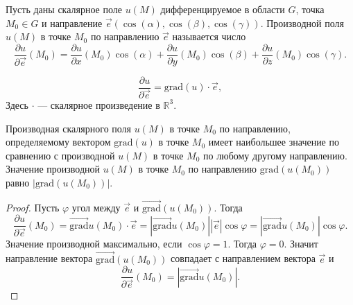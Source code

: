\begin{definition}
    Пусть даны скалярное поле $ u(M) $ дифференцируемое в области $ G $, точка $ M_{0} \in G $ и направление $ \vec{e}\left(
        \cos(\alpha), \cos(\beta), \cos(\gamma)\right) $. Производной поля $ u(M) $ в точке $ M_{0} $ по направлению $ \vec{e} $
    называется число
    \begin{equation} \nonumber
        \frac{\partial u}{\partial \vec{e}}(M_{0}) = \frac{\partial u}{\partial x}(M_{0})\cos(\alpha) + \frac{\partial u} {\partial y}(M_{0})\cos(\beta) + \frac{\partial u}{\partial z}(M_{0})\cos(\gamma).
    \end{equation}
\end{definition}

\begin{remark}
    \begin{equation} \nonumber
        \frac{\partial u}{\partial \vec{e}} = \text{grad}(u) \cdot \vec{e},
    \end{equation}
    Здесь $ \cdot $ --- скалярное произведение в $ \mathbb{R}^{3} $.
\end{remark}

\begin{theorem}
    Производная скалярного поля $ u(M) $ в точке $ M_{0} $ по направлению, определяемому вектором $ \text{grad}(u) $ в точке $ M_{0} $
    имеет наибольшее значение по сравнению с производной $ u(M) $ в точке $ M_{0} $ по любому другому направлению. Значение производной
    $ u(M) $ в точке $ M_{0} $ по направлению $ \text{grad}(u(M_{0})) $ равно $ |\text{grad}(u(M_{0}))| $.
\end{theorem}
\begin{proof}
    Пусть $ \varphi $ угол между $ \vec{e} $ и $ \vec{\text{grad}}(u(M_{0})) $. Тогда
    \begin{equation} \nonumber
        \frac{\partial u}{\partial \vec{e}}(M_{0}) = \vec{\text{grad}}u(M_{0}) \cdot \vec{e} =
        |\vec{\text{grad}}u(M_{0})| |\vec{e}| \cos\varphi = |\vec{\text{grad}}u(M_{0})|
        \cos\varphi.
    \end{equation}
    Значение производной максимально, если $ \cos\varphi = 1 $. Тогда $ \varphi = 0 $. Значит направление вектора
    $ \vec{\text{grad}}(u(M_{0})) $ совпадает с направлением вектора $ \vec{e} $ и
    \begin{equation} \nonumber
        \frac{\partial u}{\partial \vec{e}}(M_{0}) = |\vec{\text{grad}}u(M_{0})|.
    \end{equation}
\end{proof}

